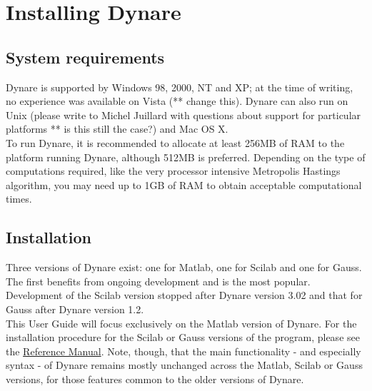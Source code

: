 \chapter{Installing Dynare} \label{ch:inst}

\section{System requirements}
Dynare is supported by Windows 98, 2000, NT and XP; at the time of writing, no experience was available on Vista (** change this). Dynare can also run on Unix (please write to Michel Juillard with questions about support for particular platforms ** is this still the case?) and Mac OS X. \\

To run Dynare, it is recommended to allocate at least 256MB of RAM to the platform running Dynare, although 512MB is preferred. Depending on the type of computations required, like the very processor intensive Metropolis Hastings algorithm, you may need up to 1GB of RAM to obtain acceptable computational times. \\

\section{Installation}
Three versions of Dynare exist: one for Matlab, one for Scilab and one for Gauss. The first benefits from ongoing development and is the most popular. Development of the Scilab version stopped after Dynare version 3.02 and that for Gauss after Dynare version 1.2. \\

This User Guide will focus exclusively on the Matlab version of Dynare. For the installation procedure for the Scilab or Gauss versions of the program, please see the \href{http://www.cepremap.cnrs.fr/juillard/mambo/index.php?option=com_content&task=view&id=51&Itemid=84}{Reference Manual}. Note, though, that the main functionality - and especially syntax - of Dynare remains mostly unchanged across the Matlab, Scilab or Gauss versions, for those features common to the older versions of Dynare. \\

